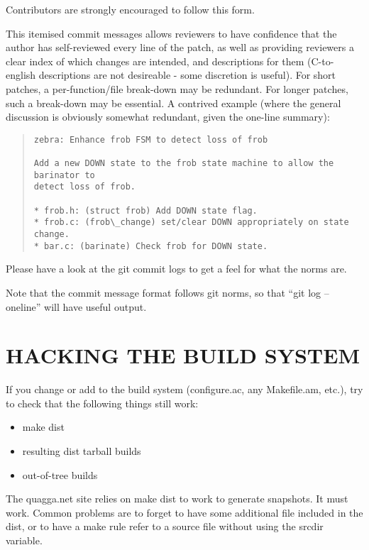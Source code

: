 \documentclass[oneside]{article}
\begin{document}
Contributors are strongly encouraged to follow this form.

This itemised commit messages allows reviewers to have confidence that the
author has self-reviewed every line of the patch, as well as providing
reviewers a clear index of which changes are intended, and descriptions for
them (C-to-english descriptions are not desireable - some discretion is
useful).  For short patches, a per-function/file break-down may be
redundant.  For longer patches, such a break-down may be essential.  A
contrived example (where the general discussion is obviously somewhat
redundant, given the one-line summary):

\begin{quote}\begin{verbatim}
zebra: Enhance frob FSM to detect loss of frob

Add a new DOWN state to the frob state machine to allow the barinator to
detect loss of frob.

* frob.h: (struct frob) Add DOWN state flag.
* frob.c: (frob\_change) set/clear DOWN appropriately on state change.
* bar.c: (barinate) Check frob for DOWN state.
\end{verbatim}\end{quote}

Please have a look at the git commit logs to get a feel for what the norms
are.

Note that the commit message format follows git norms, so that ``git
log --oneline'' will have useful output.

\section{HACKING THE BUILD SYSTEM}

If you change or add to the build system (configure.ac, any Makefile.am,
etc.), try to check that the following things still work:

\begin{itemize}
\item make dist
\item resulting dist tarball builds
\item out-of-tree builds
\end{itemize}

The quagga.net site relies on make dist to work to generate snapshots. It
must work. Common problems are to forget to have some additional file
included in the dist, or to have a make rule refer to a source file without
using the srcdir variable.
\end{document}
